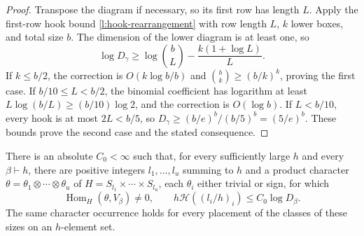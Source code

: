 \begin{proof}
Transpose the diagram if necessary, so its first row has length $L$.
Apply the first-row hook bound \eqref{l:hook-rearrangement} with
row length $L$, $k$ lower boxes, and total size $b$.
The dimension of the lower diagram is at least one, so
\[
 \log D_\gamma\ge\log\binom bL-\frac{k(1+\log L)}{L}.
\]
If $k\le b/2$, the correction is $O(k\log b/b)$ and
$\binom bk\ge(b/k)^k$, proving the first case.  If
$b/10\le L<b/2$, the binomial coefficient has logarithm at least
$L\log(b/L)\ge(b/10)\log2$, and the correction is $O(\log b)$.
If $L<b/10$, every hook is at most $2L<b/5$, so
$D_\gamma\ge(b/e)^b/(b/5)^b=(5/e)^b$.
These bounds prove the second case and the stated consequence.
\end{proof}

\begin{lemma}
\label{l:signed-palette}
There is an absolute $C_0<\infty$ such that, for every sufficiently
large $h$ and every $\beta\vdash h$, there are positive integers
$l_1,\ldots,l_u$ summing to $h$ and a product character
$\theta=\theta_1\otimes\cdots\otimes\theta_u$ of
$H=S_{l_1}\times\cdots\times S_{l_u}$, each $\theta_i$ either
trivial or sign, for which
\begin{equation}
 \operatorname{Hom}_H(\theta,V_\beta)\ne0,
 \qquad h\mathcal H((l_i/h)_i)\le C_0\log D_\beta.
 \label{l:signed-palette-bound}
\end{equation}
The same character occurrence holds for every placement of the classes
of these sizes on an $h$-element set.
\end{lemma}

